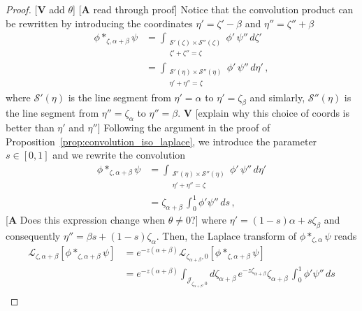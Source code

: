 \documentclass{article}
\newcommand{\laplace}{\mathcal{L}}
\theoremstyle{definition}
\theoremstyle{plain}
\newenvironment{todo}{\color{Coral}}{\color{black}}
\begin{document}
\begin{proof}
\begin{todo}
[\textbf{V} add $\theta$] [\textbf{A} read through proof]
\end{todo}
  Notice that the convolution product can be rewritten by introducing the coordinates $\eta'=\zeta'-\beta$ and $\eta''=\zeta''+\beta$
   \begin{align*}
       \phi \ast_{\zeta, \alpha+\beta} \psi &= \int_{\substack{\mathcal{S}'(\zeta) \times \mathcal{S}''(\zeta) \\ \zeta' + \zeta'' = \zeta}} \phi'\,\psi''\,d\zeta'\\
       &=\int_{\substack{\mathcal{S}'(\eta) \times \mathcal{S}''(\eta) \\ \eta' + \eta'' = \zeta}} \phi'\,\psi''\,d\eta'\,,
   \end{align*}
   where $\mathcal{S}'(\eta)$ is the line segment from $\eta'=\alpha$ to $\eta'=\zeta_\beta$ and simlarly, $\mathcal{S}''(\eta)$ is the line segment from $\eta''=\zeta_\alpha$ to $\eta''=\beta$. \begin{todo}\textbf{V} [explain why this choice of coords is better than $\eta'$ and $\eta''$]\end{todo} Following the argument in the proof of Proposition~\ref{prop:convolution_iso_laplace}, we introduce the parameter $s\in [0,1]$ and we rewrite the convolution  
    \begin{align*}
       \phi \ast_{\zeta, \alpha+\beta} \psi
       &=\int_{\substack{\mathcal{S}'(\eta) \times \mathcal{S}''(\eta) \\ \eta' + \eta'' = \zeta}} \phi'\,\psi''\,d\eta'\\
       &=\zeta_{\alpha+\beta}\,\int_0^1 \phi' \psi''\,ds\,,
   \end{align*}
   \begin{todo}[\textbf{A} Does this expression change when $\theta \neq 0$?]\end{todo} where $\eta'=(1-s)\alpha+s\zeta_\beta$ and consequently $\eta''=\beta s+(1-s)\zeta_\alpha$. Then, the Laplace transform of $\phi \ast_{\zeta, \alpha} \psi$ reads
     \begin{align*}
       \laplace_{\zeta,\alpha+\beta}[{\phi}\ast_{\zeta, \alpha+\beta}{\psi}]&=e^{-z(\alpha+\beta)}\laplace_{\zeta_{\alpha+\beta},0}[{\phi}\ast_{\zeta, \alpha+\beta}{\psi}]\\
       &=e^{-z(\alpha+\beta)}\int_{\mathcal{J}_{\zeta_{\alpha+\beta},0}}d\zeta_{\alpha+\beta}\,e^{-z\zeta_{\alpha+\beta}}\zeta_{\alpha+\beta}\, \int_0^1 \phi' \psi''\,ds \\

\end{align*}
\end{proof}
\end{document}
